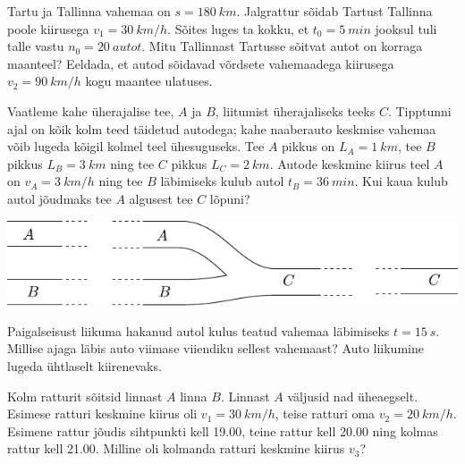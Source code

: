 \documentclass[10pt, twoside]{article}
\begin{document}
{%

Tartu ja Tallinna vahemaa on $s = \SI{180}{km}$. Jalgrattur sõidab Tartust Tallinna poole kiirusega $v_1 = \SI{30}{km/h}$. Sõites luges ta kokku, et $t_0 = \SI{5}{min}$ jooksul tuli talle vastu $n_0 = \SI{20}{autot}$. Mitu Tallinnast Tartusse sõitvat autot on korraga maanteel? Eeldada, et autod sõidavad võrdsete vahemaadega kiirusega $v_2 = \SI{90}{km/h}$ kogu maantee ulatuses.
\probend
\bigskip


Vaatleme kahe üherajalise tee, $A$ ja $B$, liitumist üherajaliseks teeks $C$. Tipptunni ajal on kõik kolm teed täidetud autodega; kahe naaberauto keskmise vahemaa võib lugeda kõigil kolmel teel ühesuguseks. Tee $A$ pikkus on $L_A = \SI{1}{km}$, tee $B$ pikkus $L_B = \SI{3}{km}$ ning tee $C$ pikkus $L_C = \SI{2}{km}$. Autode keskmine kiirus teel $A$ on $v_A = \SI{3}{km/h}$ ning tee $B$ läbimiseks kulub autol $t_B = \SI{36}{min}$. Kui kaua kulub autol jõudmaks tee $A$ algusest tee $C$ lõpuni?
\begin{center}
	\includegraphics[width=0.9\linewidth]{2007-v2g-02-yl}
\end{center}
\probend
\bigskip


Paigalseisust liikuma hakanud autol kulus teatud vahemaa läbimiseks $t = \SI{15}{s}$. Millise ajaga läbis auto viimase viiendiku sellest vahemaast? Auto liikumine lugeda ühtlaselt kiirenevaks.
\probend
\bigskip


Kolm ratturit sõitsid linnast $A$ linna $B$. Linnast $A$ väljusid nad üheaegselt. Esimese ratturi keskmine kiirus oli $v_1 = \SI{30}{km/h}$, teise ratturi oma $v_2 = \SI{20}{km/h}$. Esimene rattur jõudis sihtpunkti kell 19.00, teine rattur kell 20.00 ning kolmas rattur kell 21.00. Milline oli kolmanda ratturi keskmine kiirus $v_3$?
\probend
\bigskip

}
\end{document}

